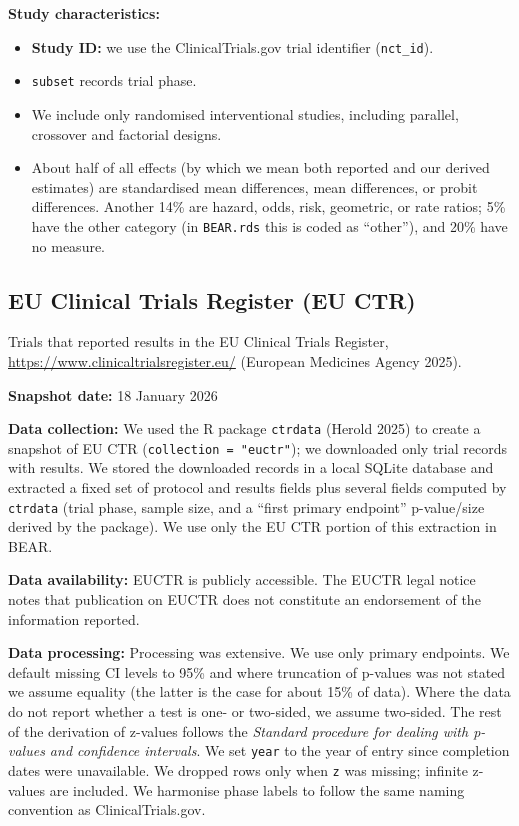 \documentclass[
  11pt,
]{article}
\providecommand{\tightlist}{%
  \setlength{\itemsep}{0pt}\setlength{\parskip}{0pt}}
\begin{document}
\textbf{Study characteristics:}

\begin{itemize}
\tightlist
\item
  \textbf{Study ID:} we use the ClinicalTrials.gov trial identifier
  (\texttt{nct\_id}).
\item
  \texttt{subset} records trial phase.
\item
  We include only randomised interventional studies, including parallel,
  crossover and factorial designs.
\item
  About half of all effects (by which we mean both reported and our
  derived estimates) are standardised mean differences, mean
  differences, or probit differences. Another 14\% are hazard, odds,
  risk, geometric, or rate ratios; 5\% have the other category (in
  \texttt{BEAR.rds} this is coded as ``other''), and 20\% have no
  measure.
\end{itemize}

\newpage

\subsection{EU Clinical Trials Register (EU
CTR)}\label{eu-clinical-trials-register-eu-ctr}

Trials that reported results in the EU Clinical Trials Register,
\url{https://www.clinicaltrialsregister.eu/} (European Medicines Agency
2025).

\textbf{Snapshot date:} 18 January 2026

\textbf{Data collection:} We used the R package \texttt{ctrdata} (Herold
2025) to create a snapshot of EU CTR (\texttt{collection\ =\ "euctr"});
we downloaded only trial records with results. We stored the downloaded
records in a local SQLite database and extracted a fixed set of protocol
and results fields plus several fields computed by \texttt{ctrdata}
(trial phase, sample size, and a ``first primary endpoint'' p-value/size
derived by the package). We use only the EU CTR portion of this
extraction in BEAR.

\textbf{Data availability:} EUCTR is publicly accessible. The EUCTR
legal notice notes that publication on EUCTR does not constitute an
endorsement of the information reported.

\textbf{Data processing:} Processing was extensive. We use only primary
endpoints. We default missing CI levels to 95\% and where truncation of
p-values was not stated we assume equality (the latter is the case for
about 15\% of data). Where the data do not report whether a test is one-
or two-sided, we assume two-sided. The rest of the derivation of
z-values follows the \emph{Standard procedure for dealing with p-values
and confidence intervals}. We set \texttt{year} to the year of entry
since completion dates were unavailable. We dropped rows only when
\texttt{z} was missing; infinite z-values are included. We harmonise
phase labels to follow the same naming convention as ClinicalTrials.gov.
\end{document}
